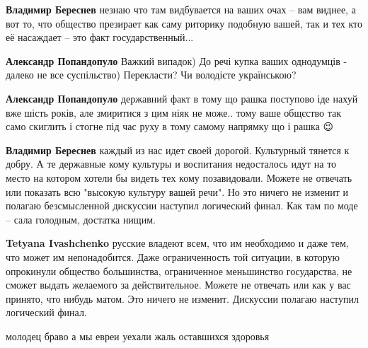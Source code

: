\begin{itemize}
\begin{itemize}
\textbf{Владимир Береснев} незнаю что там видбувается на ваших очах – вам
виднее, а вот то, что общество презирает как саму риторику подобную вашей, так
и тех кто её насаждает – это факт государственный...



\textbf{Александр Попандопуло} Важкий випадок)
До речі купка ваших однодумців - далеко не все суспільство) Перекласти? Чи
володієте українською?


\textbf{Александр Попандопуло} державний факт в тому що рашка поступово іде
нахуй вже шість років, але змиритися з цим ніяк не може.. тому ваше общєство
так само скиглить і стогне під час руху в тому самому напрямку що і рашка 😉


\textbf{Владимир Береснев} каждый из нас идет своей дорогой. Культурный тянется
к добру. А те державные кому культуры и воспитания недосталось идут на то место
на котором хотели бы видеть тех кому позавидовали. Можете не отвечать или
показать всю "высокую культуру вашей речи". Но это ничего не изменит и полагаю
безсмысленной дискуссии наступил логический финал. Как там по моде – сала
голодным, достатка нищим.


\textbf{Tetyana Ivashchenko} русские владеют всем, что им необходимо и даже
тем, что может им непонадобится. Даже ограниченность той ситуации, в которую
опрокинули общество большинства, ограниченное меньшинство государства, не
сможет выдать желаемого за действительное. Можете не отвечать или как у вас
принято, что нибудь матом. Это ничего не изменит. Дискуссии полагаю наступил
логический финал.
\end{itemize}


молодец браво а мы евреи уехали жаль оставшихся здоровья




\end{itemize}
